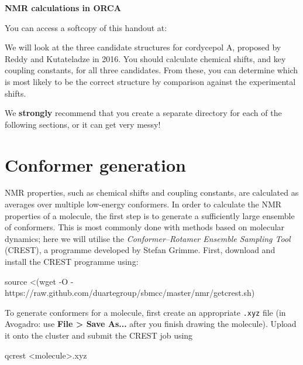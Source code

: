 \documentclass[10pt]{article}
\begin{document}

\textbf{\LARGE NMR calculations in ORCA}

\vspace{0.5cm}

You can access a softcopy of this handout at:

\begin{center}
\end{center}

We will look at the three candidate structures for cordycepol A, proposed by Reddy and Kutateladze in 2016.\autocite{Reddy2016} You should calculate chemical shifts, and key coupling constants, for all three candidates. From these, you can determine which is most likely to be the correct structure by comparison against the experimental shifts.

\begin{warning}
We \textbf{strongly} recommend that you create a separate directory for each of the following sections, or it can get very messy!
\end{warning}

\section{Conformer generation}

NMR properties, such as chemical shifts and coupling constants, are calculated as averages over multiple low-energy conformers. In order to calculate the NMR properties of a molecule, the first step is to generate a sufficiently large ensemble of conformers. This is most commonly done with methods based on molecular dynamics; here we will utilise the \textit{Conformer--Rotamer Ensemble Sampling Tool} (CREST), a programme developed by Stefan Grimme.\autocite{Bannwarth2019, Grimme2019} First, download and install the CREST programme using:

\begin{cmdline}
source <(wget -O - https://raw.github.com/duartegroup/sbmcc/master/nmr/getcrest.sh)
\end{cmdline}

To generate conformers for a molecule, first create an appropriate \texttt{.xyz} file (in Avogadro: use \textbf{File > Save As...} after you finish drawing the molecule). Upload it onto the cluster and submit the CREST job using

\begin{cmdline}
qcrest <molecule>.xyz
\end{cmdline}
\end{document}

